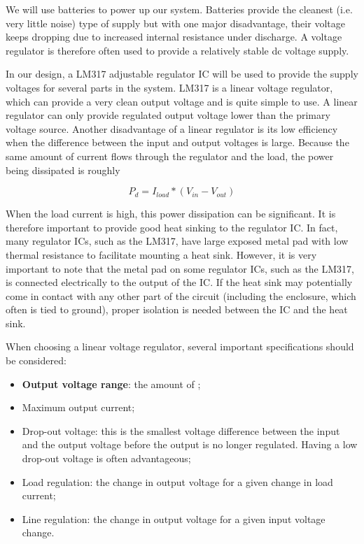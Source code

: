 \documentclass[letterpaper, 11pt]{article}
\begin{document}
We will use batteries to power up our system. Batteries provide the cleanest (i.e. very little noise) type of supply but with one major disadvantage, their voltage keeps dropping due to increased internal resistance under discharge. A voltage regulator is therefore often used to provide a relatively stable dc voltage supply.

In our design, a LM317 adjustable regulator IC will be used to provide the supply voltages for several parts in the system. LM317 is a linear voltage regulator, which can provide a very clean output voltage and is quite simple to use. A linear regulator can only provide regulated output voltage lower than the primary voltage source. Another disadvantage of a linear regulator is its low efficiency when the difference between the input and output voltages is large. Because the same amount of current flows through the regulator and the load, the power being dissipated is roughly 

\begin{equation}
	P_d=I_{load}*\left( V_{in}-V_{out}\right)
\end{equation}

When the load current is high, this power dissipation can be significant. It is therefore important to provide good heat sinking to the regulator IC. In fact, many regulator ICs, such as the LM317,  have large exposed metal pad with low thermal resistance to facilitate mounting a heat sink.  However, it is very important to note that the metal pad on some regulator ICs, such as the LM317, is connected electrically to the output of the IC. If the heat sink may potentially come in contact with any other part of the circuit (including the enclosure, which often is tied to ground), proper isolation is needed between the IC and the heat sink. 

When choosing a linear voltage regulator, several important specifications should be considered:
\begin{itemize}[itemsep=0.5ex]
	\item \textbf{Output voltage range}: the amount of ;
	\item Maximum output current;
	\item Drop-out voltage: this is the smallest voltage difference between the input and the output voltage before the output is no longer regulated. Having a low drop-out voltage is often advantageous;
	\item Load regulation: the change in output voltage for a given change in load current;
	\item Line regulation: the change in output voltage for a given input voltage change. 
\end{itemize}
\end{document}
